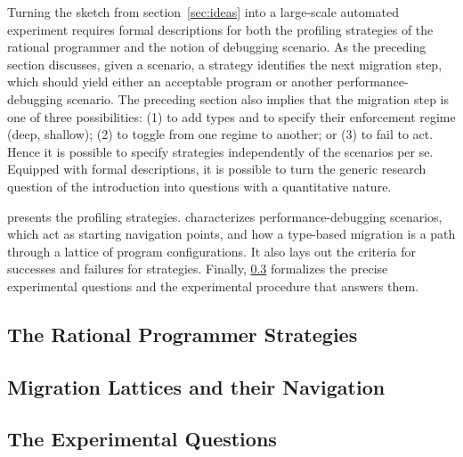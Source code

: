 
Turning the sketch from section~\ref{sec:ideas} into a large-scale
automated experiment requires formal descriptions for both the profiling
strategies of the rational programmer and the notion of debugging
scenario. As the preceding section discusses, given a scenario, a strategy
identifies the next migration step, which should yield either an acceptable
program or another performance-debugging scenario.  The preceding section
also implies that the migration step is one of three possibilities: (1)
to add types and to specify their enforcement regime (deep, shallow); (2)
to toggle from one regime to another; or (3) to fail to act. Hence it is
possible to specify strategies independently of the scenarios per se.
Equipped with formal descriptions, it is possible to turn the generic
research question of the introduction into questions with a quantitative
nature.

 presents the profiling strategies.
 characterizes performance-debugging
scenarios, which act as starting navigation points,
and how a type-based migration is a path
through a lattice of program configurations.
It also lays out the criteria for successes and failures for strategies.
Finally, \cref{subsec:questions} formalizes the precise experimental
questions and the experimental procedure that answers them.


\def\exp#1#2{\subsection{#2} \label{subsec:#1} }

\exp{strategies}{The Rational Programmer Strategies}
\exp{lattice}{Migration Lattices and their Navigation}
\exp{questions}{The Experimental Questions}
